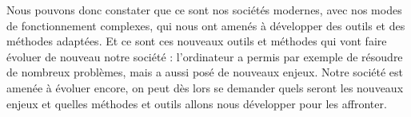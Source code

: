 Nous pouvons donc constater que ce sont nos sociétés modernes, avec nos modes de fonctionnement complexes, qui nous ont amenés à développer des outils et des méthodes adaptées. Et ce sont ces nouveaux outils et méthodes qui vont faire évoluer de nouveau notre société : l'ordinateur a permis par exemple de résoudre de nombreux problèmes, mais a aussi posé de nouveaux enjeux. Notre société est amenée à évoluer encore, on peut dès lors se demander quels seront les nouveaux enjeux et quelles méthodes et outils allons nous développer pour les affronter.
